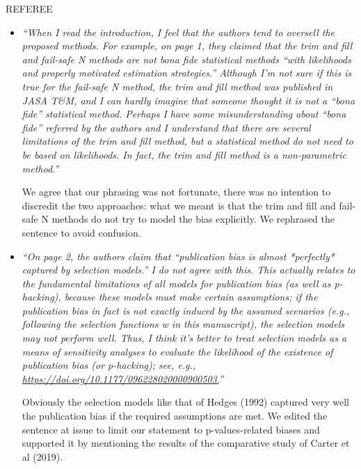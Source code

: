 \documentclass[11pt]{article}
\begin{document}
\vspace{3cm}

\begin{center}
REFEREE
\end{center}

\begin{itemize}
\item \emph{``When I read the introduction, I feel that the authors tend to oversell the proposed methods. For example, on page 1, they claimed that the trim and fill and fail-safe N methods are not bona fide statistical methods ``with likelihoods and properly motivated estimation strategies.'' Although I'm not sure if this is true for the fail-safe N method, the trim and fill method was published in JASA T\&M, and I can hardly imagine that someone thought it is not a ``bona fide'' statistical method. Perhaps I have some misunderstanding about ``bona fide'' referred by the authors and I understand that there are several limitations of the trim and fill method, but a statistical method do not need to be based on likelihoods. In fact, the trim and fill method is a non-parametric method.''}


We agree that our phrasing was not fortunate, there was no intention to discredit the two approaches: what we meant is that the trim and fill and fail-safe N methods do not try to model the bias explicitly. We rephrased the sentence to avoid confusion.


\item \emph{``On page 2, the authors claim that ``publication bias is almost *perfectly* captured by selection models.'' I do not agree with this. This actually relates to the fundamental limitations of all models for publication bias (as well as p-hacking), because these models must make certain assumptions; if the publication bias in fact is not exactly induced by the assumed scenarios (e.g., following the selection functions w in this manuscript), the selection models may not perform well. Thus, I think it's better to treat selection models as a means of sensitivity analyses to evaluate the likelihood of the existence of publication bias (or p-hacking); see, e.g., \url{https://doi.org/10.1177/096228020000900503.}''}

Obviously the selection models like that of Hedges (1992) captured very well the publication bias if the required assumptions are met. We edited the sentence at issue to limit our statement to p-values-related biases and supported it by mentioning the results of the comparative study of Carter et al (2019).





\end{itemize}
\end{document}
